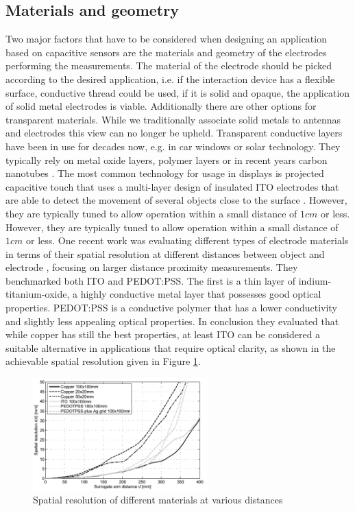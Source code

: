 \subsection{Materials and geometry}
Two major factors that have to be considered when designing an application based on capacitive sensors are the materials and geometry of the electrodes performing the measurements. The material of the electrode should be picked according to the desired application, i.e. if the interaction device has a flexible surface, conductive thread could be used, if it is solid and opaque, the application of solid metal electrodes is viable. Additionally there are other options for transparent materials. While we traditionally associate solid metals to antennas and electrodes this view can no longer be upheld. Transparent conductive layers have been in use for decades now, e.g. in car windows or solar technology. They typically rely on metal oxide layers, polymer layers or in recent years carbon nanotubes \cite{Moon2005}. The most common technology for usage in displays is projected capacitive touch that uses a multi-layer design of insulated ITO electrodes that are able to detect the movement of several objects close to the surface \cite{Barrett2010}. However, they are typically tuned to allow operation within a small distance of \(1cm\) or less. However, they are typically tuned to allow operation within a small distance of \(1cm\) or less. One recent work was evaluating different types of electrode materials in terms of their spatial resolution at different distances between object and electrode \cite{grosse2013opencapsense}, focusing on larger distance proximity measurements. They benchmarked both ITO and PEDOT:PSS. The first is a thin layer of indium-titanium-oxide, a highly conductive metal layer that possesses good optical properties. PEDOT:PSS is a conductive polymer that has a lower conductivity and slightly less appealing optical properties. In conclusion they evaluated that while copper has still the best properties, at least ITO can be considered a suitable alternative in applications that require optical clarity, as shown in the achievable spatial resolution given in Figure \ref{fig:cap_spatial_resolution}. 
\begin{figure} [h]
\centering
\includegraphics[width=0.6\textwidth]{images/cap_spatial_resolution.png} 
\caption{Spatial resolution of different materials at various distances \cite{grosse2013opencapsense}}
\label{fig:cap_spatial_resolution}
\end{figure}
